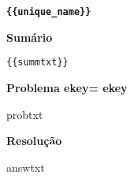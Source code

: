 \documentclass{article}
\begin{document}

{\centering\bf \verb"{{unique_name}}" }

\noindent\textbf{Sumário}

\begin{verbatim}
{{summtxt}}
\end{verbatim}

\noindent\textbf{Problema ekey={{ ekey }} }

{{probtxt}}

\noindent\textbf{Resolução}

{{answtxt}}

\end{document}
